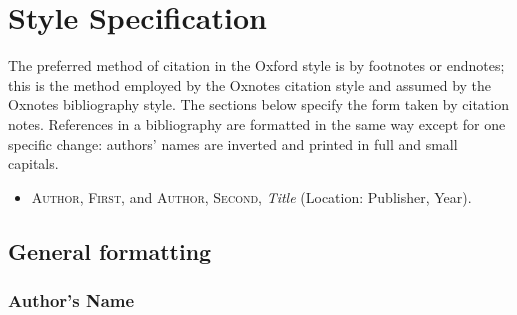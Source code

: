 \documentclass[extrafontsizes,11pt,a4paper,oneside]{memoir}
\newcommand*{\lit}[1]{\textsf{#1}}
\begin{document}
    \chapter{Style Specification}
    
    The preferred method of citation in the Oxford style is by footnotes or endnotes; this is the method employed by the Oxnotes citation style and assumed by the Oxnotes bibliography style. The sections below specify the form taken by citation notes. References in a bibliography are formatted in the same way except for one specific change: authors' names are inverted and printed in full and small capitals.
    
    \begin{itemize}
        \item
        \textsc{Author, First}, \lit{and} \textsc{Author, Second}, \emph{Title} (Location: Publisher, Year).
    \end{itemize}
    
    \section{General formatting}
    
    \subsection{Author's Name}
    
\end{document}
